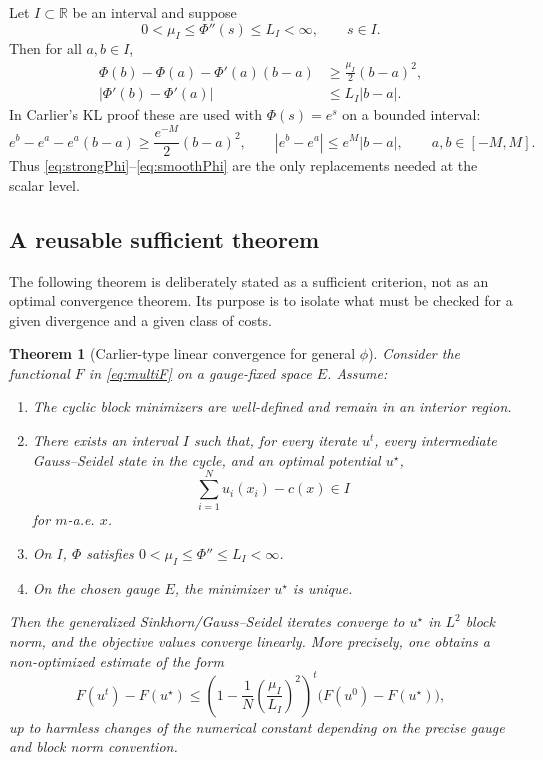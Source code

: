\documentclass[11pt]{article}
\newtheorem{theorem}{Theorem}[section]
\newcommand{\R}{\mathbb{R}}
\begin{document}
Let $I\subset\R$ be an interval and suppose
\begin{equation}\label{eq:scalar-mu-L}
  0<\mu_I\leq \Phi''(s)\leq L_I<\infty,
  \qquad s\in I.
\end{equation}
Then for all $a,b\in I$,
\begin{align}
  \Phi(b)-\Phi(a)-\Phi'(a)(b-a)
  &\geq \frac{\mu_I}{2}(b-a)^2,\label{eq:strongPhi}\\
  |\Phi'(b)-\Phi'(a)|
  &\leq L_I|b-a|.\label{eq:smoothPhi}
\end{align}
In Carlier's KL proof these are used with $\Phi(s)=e^s$ on a bounded interval:
\begin{equation*}
  e^b-e^a-e^a(b-a)\geq \frac{e^{-M}}{2}(b-a)^2,
  \qquad
  |e^b-e^a|\leq e^M|b-a|,
  \qquad a,b\in[-M,M].
\end{equation*}
Thus \eqref{eq:strongPhi}--\eqref{eq:smoothPhi} are the only replacements
needed at the scalar level.

\subsection{A reusable sufficient theorem}

The following theorem is deliberately stated as a sufficient criterion, not as
an optimal convergence theorem.  Its purpose is to isolate what must be checked
for a given divergence and a given class of costs.

\begin{theorem}[Carlier-type linear convergence for general $\phi$]\label{thm:carlier-general}
Consider the functional $F$ in \eqref{eq:multiF} on a gauge-fixed space $E$.
Assume:
\begin{enumerate}[label=(A\arabic*)]
  \item \label{A1} The cyclic block minimizers are well-defined and remain in an
  interior region.
  \item \label{A2} There exists an interval $I$ such that, for every iterate
  $u^t$, every intermediate Gauss--Seidel state in the cycle, and an optimal
  potential $u^\star$,
  \begin{equation}\label{eq:iterates-strip}
    \sum_{i=1}^N u_i(x_i)-c(x)\in I
  \end{equation}
  for $m$-a.e. $x$.
  \item \label{A3} On $I$, $\Phi$ satisfies
  $0<\mu_I\leq \Phi''\leq L_I<\infty$.
  \item \label{A4} On the chosen gauge $E$, the minimizer $u^\star$ is unique.
\end{enumerate}
Then the generalized Sinkhorn/Gauss--Seidel iterates converge to $u^\star$ in
$L^2$ block norm, and the objective values converge linearly.  More precisely,
one obtains a non-optimized estimate of the form
\begin{equation}\label{eq:generic-rate}
  F(u^t)-F(u^\star)
  \leq
  \left(1-\frac{1}{N}\left(\frac{\mu_I}{L_I}\right)^2\right)^t
  \big(F(u^0)-F(u^\star)\big),
\end{equation}
up to harmless changes of the numerical constant depending on the precise gauge
and block norm convention.
\end{theorem}
\end{document}
